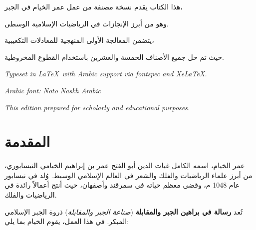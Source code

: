 \documentclass[11pt,a4paper]{book}
\newcommand{\ar}[1]{\leavevmode\arabicfont\beginR #1\endR}
\begin{document}
\thispagestyle{empty}
\vspace*{8cm}
\begin{center}
{\small\ar{هذا الكتاب يقدم نسخة مصنفة من عمل عمر الخيام في الجبر،}}

\vspace{0.3cm}

{\small\ar{وهو من أبرز الإنجازات في الرياضيات الإسلامية الوسطى.}}

\vspace{0.5cm}

{\small\ar{يتضمن المعالجة الأولى المنهجية للمعادلات التكعيبية،}}

{\small\ar{حيث تم حل جميع الأصناف الخمسة والعشرين باستخدام القطوع المخروطية.}}

\vspace{1cm}

{\footnotesize\textit{Typeset in \LaTeX\ with Arabic support via fontspec and XeLaTeX.}}

{\footnotesize\textit{Arabic font: Noto Naskh Arabic}}

\vspace{0.5cm}

{\footnotesize\textit{This edition prepared for scholarly and educational purposes.}}

\end{center}
\clearpage

\tableofcontents
\clearpage

\section{\ar{المقدمة}}

\ar{عمر الخيام}، اسمه الكامل \ar{غياث الدين أبو الفتح عمر بن إبراهيم الخيامي النيسابوري}، من أبرز علماء الرياضيات والفلك والشعر في العالم الإسلامي الوسيط. وُلد في نيسابور عام 1048 م، وقضى معظم حياته في سمرقند وأصفهان، حيث أنتج أعمالاً رائدة في الرياضيات والفلك.

تُعد \textbf{\ar{رسالة في براهين الجبر والمقابلة}} (\textit{صناعة الجبر والمقابلة}) ذروة الجبر الإسلامي المبكر. في هذا العمل، يقوم الخيام بما يلي:
\end{document}
